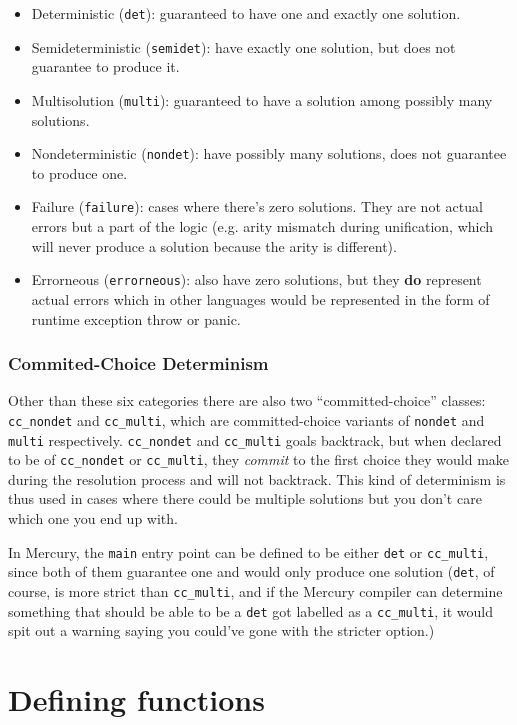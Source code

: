 \begin{itemize}
	\item Deterministic (\texttt{det}): guaranteed to have one and exactly one solution.
	\item Semideterministic (\texttt{semidet}): have exactly one solution, but does not guarantee to produce it.
	\item Multisolution (\texttt{multi}): guaranteed to have a solution among possibly many solutions.
	\item Nondeterministic (\texttt{nondet}): have possibly many solutions, does not guarantee to produce one.
	\item Failure (\texttt{failure}): cases where there's zero solutions. They are not actual errors but a part of the logic (e.g. arity mismatch during unification, which will never produce a solution because the arity is different).
	\item Errorneous (\texttt{errorneous}): also have zero solutions, but they \textbf{do} represent actual errors which in other languages would be represented in the form of runtime exception throw or panic.
\end{itemize}

\subsubsection{Commited-Choice Determinism}

Other than these six categories there are also two ``committed-choice'' classes: \texttt{cc_nondet} and \texttt{cc_multi}, which are committed-choice variants of \texttt{nondet} and \texttt{multi} respectively. \texttt{cc_nondet} and \texttt{cc_multi} goals backtrack, but when declared to be of \texttt{cc_nondet} or \texttt{cc_multi}, they \textit{commit} to the first choice they would make during the resolution process and will not backtrack. This kind of determinism is thus used in cases where there could be multiple solutions but you don't care which one you end up with.

In Mercury, the \texttt{main} entry point can be defined to be either \texttt{det} or \texttt{cc\_multi}, since both of them guarantee one and would only produce one solution (\texttt{det}, of course, is more strict than \texttt{cc\_multi}, and if the Mercury compiler can determine something that should be able to be a \texttt{det} got labelled as a \texttt{cc\_multi}, it would spit out a warning saying you could've gone with the stricter option.)

\section{Defining functions}

